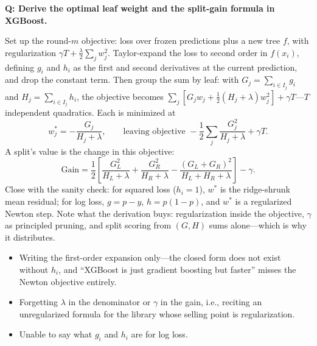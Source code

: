 \begin{interviewq}
\textbf{Q: Derive the optimal leaf weight and the split-gain formula in XGBoost.}

 \quad {} \quad \badgefreq{\freqhigh}

\stronganswer

Set up the round-$m$ objective: loss over frozen predictions plus a new tree $f$, with regularization $\gamma T + \tfrac{\lambda}{2}\sum_j w_j^2$. Taylor-expand the loss to second order in $f(x_i)$, defining $g_i$ and $h_i$ as the first and second derivatives at the current prediction, and drop the constant term. Then group the sum by leaf: with $G_j = \sum_{i \in I_j} g_i$ and $H_j = \sum_{i \in I_j} h_i$, the objective becomes $\sum_j [G_j w_j + \tfrac{1}{2}(H_j + \lambda) w_j^2] + \gamma T$---$T$ independent quadratics. Each is minimized at
\begin{equation*}
w_j^* = -\frac{G_j}{H_j + \lambda}, \qquad \text{leaving objective } -\frac{1}{2}\sum_j \frac{G_j^2}{H_j + \lambda} + \gamma T.
\end{equation*}
A split's value is the change in this objective:
\begin{equation*}
\text{Gain} = \frac{1}{2}\left[\frac{G_L^2}{H_L+\lambda} + \frac{G_R^2}{H_R+\lambda} - \frac{(G_L+G_R)^2}{H_L+H_R+\lambda}\right] - \gamma.
\end{equation*}
Close with the sanity check: for squared loss ($h_i = 1$), $w^*$ is the ridge-shrunk mean residual; for log loss, $g = p - y$, $h = p(1-p)$, and $w^*$ is a regularized Newton step. Note what the derivation buys: regularization inside the objective, $\gamma$ as principled pruning, and split scoring from $(G, H)$ sums alone---which is why it distributes.

\redflags
\begin{itemize}
    \item Writing the first-order expansion only---the closed form does not exist without $h_i$, and ``XGBoost is just gradient boosting but faster'' misses the Newton objective entirely.
    \item Forgetting $\lambda$ in the denominator or $\gamma$ in the gain, i.e., reciting an unregularized formula for the library whose selling point is regularization.
    \item Unable to say what $g_i$ and $h_i$ are for log loss.
\end{itemize}



\end{interviewq}
